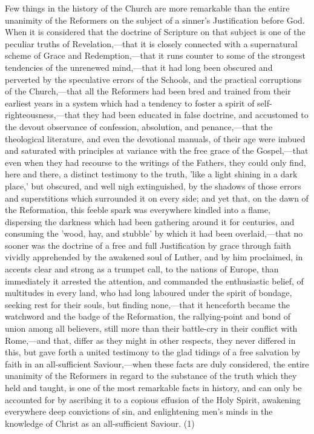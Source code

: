 \documentclass[
]{book}
\begin{document}
Few things in the history of the Church are more remarkable than the entire unanimity of the Reformers on the subject of a sinner's Justification before God. When it is considered that the doctrine of Scripture on that subject is one of the peculiar truths of Revelation,---that it is closely connected with a supernatural scheme of Grace and Redemption,---that it runs counter to some of the strongest tendencies of the unrenewed mind,---that it had long been obscured and perverted by the speculative errors of the Schools, and the practical corruptions of the Church,---that all the Reformers had been bred and trained from their earliest years in a system which had a tendency to foster a spirit of self-righteousness,---that they had been educated in false doctrine, and accustomed to the devout observance of confession, absolution, and penance,---that the theological literature, and even the devotional manuals, of their age were imbued and saturated with principles at variance with the free grace of the Gospel,---that even when they had recourse to the writings of the Fathers, they could only find, here and there, a distinct testimony to the truth, 'like a light shining in a dark place,' but obscured, and well nigh extinguished, by the shadows of those errors and superstitions which surrounded it on every side; and yet that, on the dawn of the Reformation, this feeble spark was everywhere kindled into a flame, dispersing the darkness which had been gathering around it for centuries, and consuming the 'wood, hay, and stubble' by which it had been overlaid,---that no sooner was the doctrine of a free and full Justification by grace through faith vividly apprehended by the awakened soul of Luther, and by him proclaimed, in accents clear and strong as a trumpet call, to the nations of Europe, than immediately it arrested the attention, and commanded the enthusiastic belief, of multitudes in every land, who had long laboured under the spirit of bondage, seeking rest for their souls, but finding none,---that it henceforth became the watchword and the badge of the Reformation, the rallying-point and bond of union among all believers, still more than their battle-cry in their conflict with Rome,---and that, differ as they might in other respects, they never differed in this, but gave forth a united testimony to the glad tidings of a free salvation by faith in an all-sufficient Saviour,---when these facts are duly considered, the entire unanimity of the Reformers in regard to the substance of the truth which they held and taught, is one of the most remarkable facts in history, and can only be accounted for by ascribing it to a copious effusion of the Holy Spirit, awakening everywhere deep convictions of sin, and enlightening men's minds in the knowledge of Christ as an all-sufficient Saviour. (1)
\end{document}
